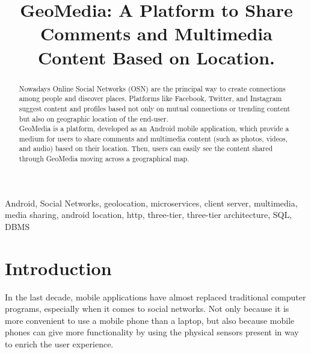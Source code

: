 \documentclass[conference]{IEEEtran}
\begin{document}
\title{GeoMedia: A Platform to Share Comments and Multimedia Content Based on Location.\\
}

\author{
\and
{}
}

\maketitle

\begin{abstract}
Nowadays Online Social Networks (OSN) are the principal way to create connections among people and discover places.
Platforms like Facebook, Twitter, and Instagram suggest content and profiles based not only on mutual connections or trending content but also on geographic location of the end-user.
\\
GeoMedia is a platform, developed as an Android mobile application, which provide a medium for users to share comments and multimedia content (such as photos, videos, and audio) based on their location.
Then, users can easily see the content shared through GeoMedia moving across a geographical map.
\end{abstract}

\begin{IEEEkeywords}
Android, Social Networks, geolocation, microservices, client server, multimedia, media sharing, android location, http, three-tier, three-tier architecture, SQL, DBMS
\end{IEEEkeywords}

\section{Introduction}
In the last decade, mobile applications have almost replaced traditional computer programs, especially when it comes to social networks. Not only because it is more convenient to use a mobile phone than a laptop, but also because mobile phones can give more functionality by using the physical sensors present in way to enrich the user experience.
\end{document}
